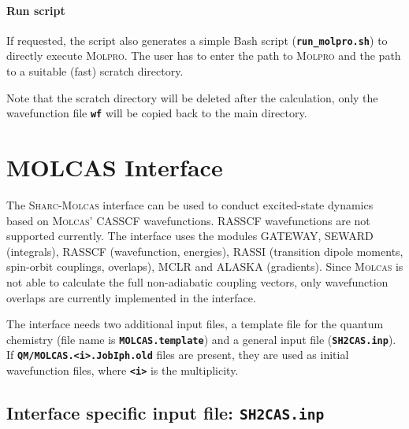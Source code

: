 \documentclass[a4paper,11pt,DIV=15,openany,twoside=false]{scrbook}
\newcommand{\sharc}{\textsc{Sharc}}
\newcommand{\ttt}[1]{\textbf{\texttt{#1}}}
\begin{document}
\paragraph{Run script}

If requested, the script also generates a simple Bash script (\ttt{run\_molpro.sh}) to directly execute \textsc{Molpro}. The user has to enter the path to \textsc{Molpro} and the path to a suitable (fast) scratch directory. 

Note that the scratch directory will be deleted after the calculation, only the wavefunction file \ttt{wf} will be copied back to the main directory.


\section{MOLCAS Interface}\label{sec:int:molcas}

The \sharc-\textsc{Molcas} interface can be used to conduct excited-state dynamics based on \textsc{Molcas}' CASSCF wavefunctions. RASSCF wavefunctions are not supported currently. The interface uses the modules GATEWAY, SEWARD (integrals), RASSCF (wavefunction, energies), RASSI (transition dipole moments, spin-orbit couplings, overlaps), MCLR and ALASKA (gradients). Since \textsc{Molcas} is not able to calculate the full non-adiabatic coupling vectors, only wavefunction overlaps are currently implemented in the interface.


The interface needs two additional input files, a template file for the quantum chemistry (file name is \ttt{MOLCAS.template}) and a general input file (\ttt{SH2CAS.inp}). If \ttt{QM/MOLCAS.<i>.JobIph.old} files are present, they are used as initial wavefunction files, where \ttt{<i>} is the multiplicity. %

\subsection{Interface specific input file: \ttt{SH2CAS.inp}}
\end{document}
